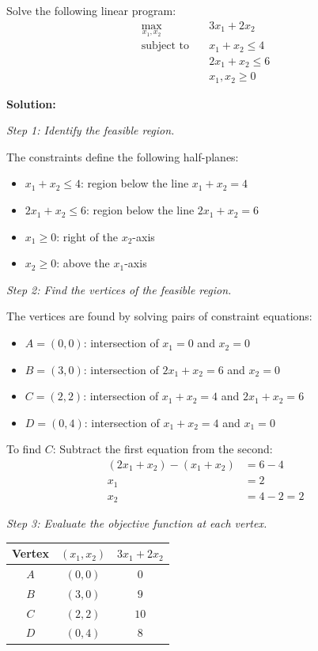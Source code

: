 \begin{examplebox}[title=Example: Linear Programming (Graphical Solution)]
Solve the following linear program:
\begin{align*}
\max_{x_1, x_2} \quad & 3x_1 + 2x_2 \\
\text{subject to} \quad & x_1 + x_2 \leq 4 \\
& 2x_1 + x_2 \leq 6 \\
& x_1, x_2 \geq 0
\end{align*}

\textbf{Solution:}

\textit{Step 1: Identify the feasible region.}

The constraints define the following half-planes:
\begin{itemize}
    \item $x_1 + x_2 \leq 4$: region below the line $x_1 + x_2 = 4$
    \item $2x_1 + x_2 \leq 6$: region below the line $2x_1 + x_2 = 6$
    \item $x_1 \geq 0$: right of the $x_2$-axis
    \item $x_2 \geq 0$: above the $x_1$-axis
\end{itemize}

\textit{Step 2: Find the vertices of the feasible region.}

The vertices are found by solving pairs of constraint equations:
\begin{itemize}
    \item $A = (0, 0)$: intersection of $x_1 = 0$ and $x_2 = 0$
    \item $B = (3, 0)$: intersection of $2x_1 + x_2 = 6$ and $x_2 = 0$
    \item $C = (2, 2)$: intersection of $x_1 + x_2 = 4$ and $2x_1 + x_2 = 6$
    \item $D = (0, 4)$: intersection of $x_1 + x_2 = 4$ and $x_1 = 0$
\end{itemize}

To find $C$: Subtract the first equation from the second:
\begin{align*}
(2x_1 + x_2) - (x_1 + x_2) &= 6 - 4 \\
x_1 &= 2 \\
x_2 &= 4 - 2 = 2
\end{align*}

\textit{Step 3: Evaluate the objective function at each vertex.}

\begin{center}
\begin{tabular}{ccc}
\toprule
\textbf{Vertex} & $(x_1, x_2)$ & $3x_1 + 2x_2$ \\
\midrule
$A$ & $(0, 0)$ & $0$ \\
$B$ & $(3, 0)$ & $9$ \\
$C$ & $(2, 2)$ & $10$ \\
$D$ & $(0, 4)$ & $8$ \\
\bottomrule
\end{tabular}
\end{center}


\end{examplebox}
